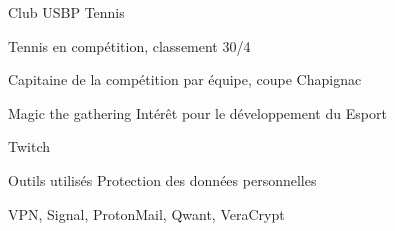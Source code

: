

\begin{cventries}

  \cventry
    {Club USBP} %
    {Tennis} %
    {} %
    {} %
    {
      \begin{cvitems} %
        \item {Tennis en compétition, classement 30/4}
        \item {Capitaine de la compétition par équipe, coupe Chapignac}
      \end{cvitems}
    }

  \cventry
    {Magic the gathering} %
    {Intérêt pour le développement du Esport} %
    {} %
    {} %
    {
      \begin{cvitems} %
        \item {Twitch}
      \end{cvitems}
    }

  \cventry
    {Outils utilisés} %
    {Protection des données personnelles} %
    {} %
    {} %
    {
      \begin{cvitems} %
        \item {VPN, Signal, ProtonMail, Qwant, VeraCrypt}
      \end{cvitems}
    }

\end{cventries}
